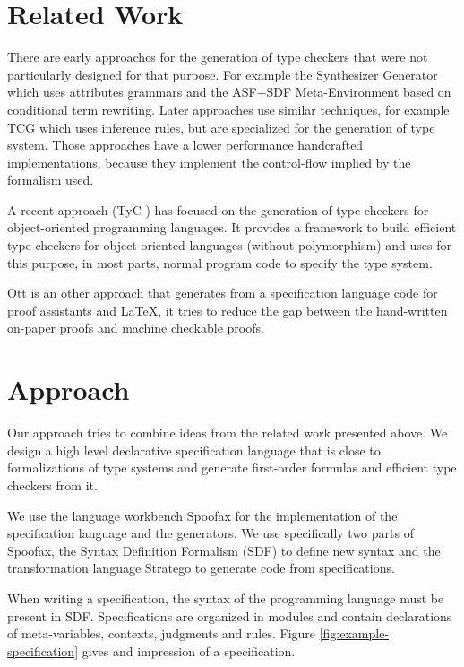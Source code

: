 \documentclass{acm_proc_article-sp}
\begin{document}
\section{Related Work}
There are early approaches for the generation of type checkers that
were not particularly designed for that purpose. For example the
Synthesizer Generator \cite{Reps:1984:SG:800020.808247} which uses
attributes grammars and the ASF+SDF Meta-Environment
\cite{vandenBrand:2001:AMC:647477.727788} based on conditional term
rewriting. Later approaches use similar techniques, for example TCG
\cite{phd/de/Gast2005} which uses inference rules, but are specialized
for the generation of type system. Those approaches have a lower
performance handcrafted implementations, because they implement the
control-flow implied by the formalism used.

A recent approach (TyC \cite{ortin2014automatic}) has focused on the
generation of type checkers for object-oriented programming
languages. It provides a framework to build efficient type checkers
for object-oriented languages (without polymorphism) and uses for this
purpose, in most parts, normal program code to specify the type
system.

Ott \cite{journals/jfp/SewellNOPRSS10} is an other approach that
generates from a specification language code for proof assistants and
\LaTeX, it tries to reduce the gap between the hand-written on-paper
proofs and machine checkable proofs.
\section{Approach}
Our approach tries to combine ideas from the related work presented
above. We design a high level declarative specification language that
is close to formalizations of type systems and generate first-order
formulas and efficient type checkers from it.

We use the language workbench Spoofax \cite{KatsVisser2010} for the
implementation of the specification language and the generators. We
use specifically two parts of Spoofax, the Syntax Definition Formalism
(SDF) to define new syntax and the transformation language Stratego to
generate code from specifications. 

When writing a specification, the syntax of the programming language
must be present in SDF. Specifications are organized in modules and
contain declarations of meta-variables, contexts, judgments and
rules. Figure \ref{fig:example-specification} gives and impression of a
specification.
\end{document}
